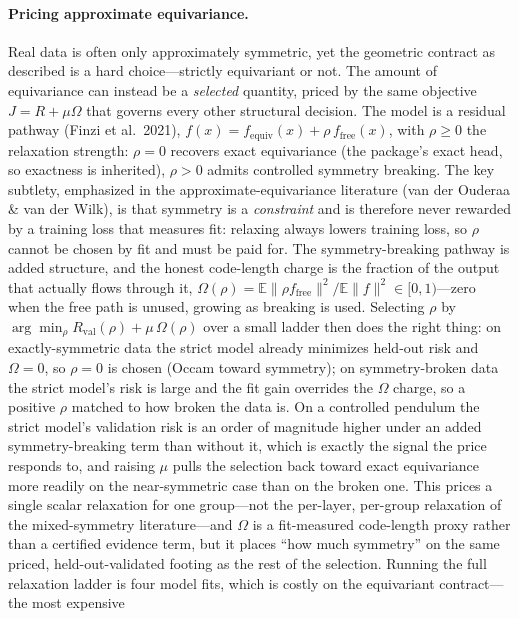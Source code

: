 \documentclass[11pt]{article}
\begin{document}
\paragraph{Pricing approximate equivariance.} Real data is often only approximately symmetric, yet the
geometric contract as described is a hard choice---strictly equivariant or not. The amount of equivariance can
instead be a \emph{selected} quantity, priced by the same objective $J=R+\mu\Omega$ that governs every other
structural decision. The model is a residual pathway (Finzi et al.\ 2021), $f(x)=f_{\mathrm{equiv}}(x)+
\rho\,f_{\mathrm{free}}(x)$, with $\rho\ge 0$ the relaxation strength: $\rho=0$ recovers exact equivariance
(the package's exact head, so exactness is inherited), $\rho>0$ admits controlled symmetry breaking. The key
subtlety, emphasized in the approximate-equivariance literature (van der Ouderaa \& van der Wilk), is that
symmetry is a \emph{constraint} and is therefore never rewarded by a training loss that measures fit: relaxing
always lowers training loss, so $\rho$ cannot be chosen by fit and must be paid for. The symmetry-breaking
pathway is added structure, and the honest code-length charge is the fraction of the output that actually
flows through it, $\Omega(\rho)=\mathbb{E}\|\rho f_{\mathrm{free}}\|^2/\mathbb{E}\| f\|^2\in[0,
1)$---zero when the free path is unused, growing as breaking is used. Selecting $\rho$ by $\arg\min_\rho
R_{\mathrm{val}}(\rho)+\mu\,\Omega(\rho)$ over a small ladder then does the right thing: on exactly-symmetric
data the strict model already minimizes held-out risk and $\Omega=0$, so $\rho=0$ is chosen (Occam toward
symmetry); on symmetry-broken data the strict model's risk is large and the fit gain overrides the $\Omega$
charge, so a positive $\rho$ matched to how broken the data is. On a controlled pendulum the strict model's
validation risk is an order of magnitude higher under an added symmetry-breaking term than without it, which
is exactly the signal the price responds to, and raising $\mu$ pulls the selection back toward exact
equivariance more readily on the near-symmetric case than on the broken one. This prices a single scalar
relaxation for one group---not the per-layer, per-group relaxation of the mixed-symmetry literature---and
$\Omega$ is a fit-measured code-length proxy rather than a certified evidence term, but it places ``how much
symmetry'' on the same priced, held-out-validated footing as the rest of the selection. Running the full
relaxation ladder is four model fits, which is costly on the equivariant contract---the most expensive
\end{document}
